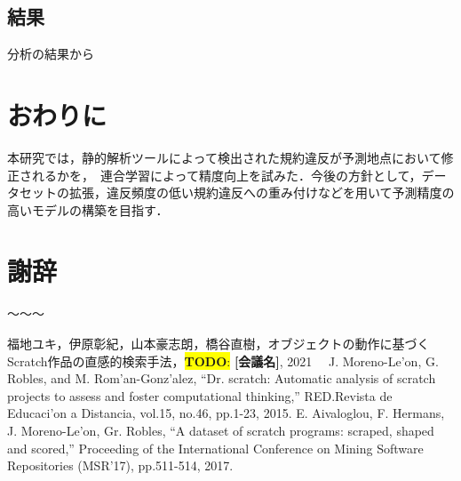 \documentclass[uplatex,dvipdfmx,a4paper,twocolumn,base=11pt,jbase=11pt,ja=standard]{bxjsarticle}  %
\newcommand{\todo}[1]{\colorbox{yellow}{{\bf TODO}:}{\color{red} {\textbf{[#1]}}}}
\begin{document}


\subsection{結果}
分析の結果から~~~~~






\section{おわりに}

本研究では，静的解析ツールによって検出された規約違反が予測地点において修正されるかを，　連合学習によって精度向上を試みた．今後の方針として，データセットの拡張，違反頻度の低い規約違反への重み付けなどを用いて予測精度の高いモデルの構築を目指す．






\section*{謝辞}
〜〜〜


\begin{thebibliography}{1}
   福地ユキ，伊原彰紀，山本豪志朗，橋谷直樹，オブジェクトの動作に基づくScratch作品の直感的検索手法，\todo{会議名}, 2021
  　J. Moreno-Le'on, G. Robles, and M. Rom'an-Gonz'alez, ``Dr. scratch: Automatic analysis of scratch projects to assess and foster computational thinking,'' RED.Revista de Educaci'on a Distancia, vol.15, no.46, pp.1-23, 2015.
   E. Aivaloglou, F. Hermans, J. Moreno-Le'on, Gr. Robles, ``A dataset of scratch programs: scraped, shaped and scored,'' Proceeding of the International Conference on Mining Software Repositories (MSR'17), pp.511-514, 2017. 

\end{thebibliography}





%
\end{document}
